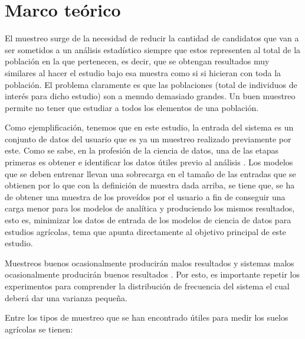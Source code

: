 \documentclass{report}
\begin{document}
\chapter{Marco teórico}

El muestreo surge de la necesidad de reducir la cantidad de candidatos que van a ser sometidos a un análisis estadístico siempre que estos representen al total de la población en la que pertenecen, es decir, que se obtengan resultados muy similares al hacer el estudio bajo esa muestra como si si hicieran con toda la población. El problema claramente es que las poblaciones (total de individuos de interés para dicho estudio) son a menudo demasiado grandes. Un buen muestreo permite no tener que estudiar a todos los elementos de una población. 

\bigbreak

Como ejemplificación, tenemos que en este estudio, la entrada del sistema es un conjunto de datos del usuario que es ya un muestreo realizado previamente por este. Como se sabe, en la profesión de la ciencia de datos, una de las etapas primeras es obtener e identificar los datos útiles previo al análisis \cite{university-of-wisconsin-data-science-2021}. Los modelos que se deben entrenar llevan una sobrecarga en el tamaño de las entradas que se obtienen por lo que con la definición de muestra dada arriba, se tiene que, se ha de obtener una muestra de los  proveídos por el usuario a fin de conseguir una carga menor para los modelos de analítica y produciendo los mismos resultados, esto es, minimizar los datos de entrada de los modelos de ciencia de datos para estudios agrícolas, tema que apunta directamente al objetivo principal de este estudio.

\bigbreak

Muestreos buenos ocasionalmente producirán malos resultados y sistemas malos ocasionalmente producirán buenos resultados \cite{gulland-1966}. Por esto, es importante repetir los experimentos para comprender la distribución de frecuencia del sistema el cual deberá dar una varianza pequeña.

\bigbreak

Entre los tipos de muestreo que se han encontrado útiles para medir los suelos agrícolas se tienen:
\end{document}
